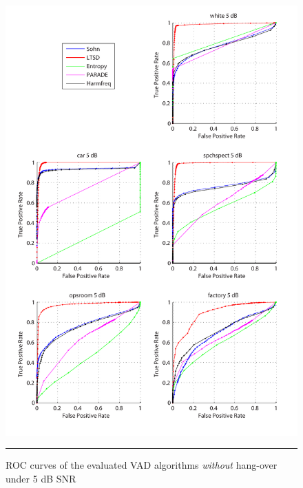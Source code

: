 \begin{figure}[htbp]
	\centering
		\includegraphics[width=1.0\columnwidth]{Figures/Chapter3/5dBnoh.pdf}
		\rule{37em}{0.5pt}
	\caption[ROC curves of the evaluated algorithms \emph{without} hang-over under 5 dB SNR]{ROC curves of the evaluated VAD algorithms \emph{without} hang-over under 5 dB SNR}
	\label{fig:5dBnoh}
\end{figure}

